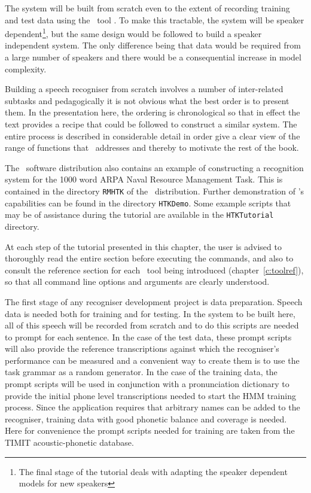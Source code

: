 The system will be built from scratch even to the extent of recording training
and test data using the \HTK\ tool .  To make this tractable, the
system will be speaker dependent\footnote{The final stage of the tutorial deals 
with adapting the speaker dependent models for new speakers}, but the same design 
would be followed to build a speaker independent system.  The only difference being 
that data would be required from a large number of speakers and there would 
be a consequential increase in model complexity. 

Building a speech recogniser from scratch involves a number of inter-related
subtasks and pedagogically it is not obvious what the best order is to present
them. In the presentation here, the ordering is chronological so that in effect
the text provides a recipe that could be followed to construct a similar
system.  The entire process is described in considerable detail in order give a
clear view of the range of functions that \HTK\ addresses and thereby to
motivate the rest of the book.

The \HTK\ software distribution also contains an example of constructing a
recognition system for the 1000 word ARPA Naval Resource Management Task. This
is contained in the directory \texttt{RMHTK} of the \HTK\ distribution.
Further demonstration of \HTK's capabilities can be found in the directory 
\texttt{HTKDemo}. Some example scripts that may be of assistance during the 
tutorial are available in the \texttt{HTKTutorial} directory.

At each step of the tutorial presented in this chapter, the user is advised to
thoroughly read the entire section before executing the commands, and also to
consult the reference section for each \HTK\ tool being introduced
(chapter~\ref{c:toolref}), so that all command line options and arguments are
clearly understood.


The first stage of any recogniser development project is data preparation.
  Speech data is needed both for training and for
testing.  In the system to be built here, all of this speech will be recorded
from scratch and to do this scripts are needed to prompt for each sentence.  In
the case of the test data, these prompt scripts will also provide the reference
transcriptions against which the recogniser's performance can be measured and a
convenient way to create them is to use the task grammar as a random generator.
In the case of the training data, the prompt scripts will be used in
conjunction with a pronunciation dictionary to provide the initial phone level
transcriptions needed to start the HMM training process.  Since the application
requires that arbitrary names can be added to the recogniser, training data
with good phonetic balance and coverage is needed.  Here for convenience the
prompt scripts needed for training are taken from the TIMIT acoustic-phonetic
database.

